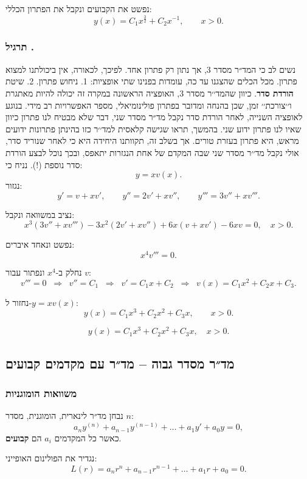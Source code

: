 \documentclass{article}
\numberwithin{equation}{section}
\newcounter{solution}[section]
\renewcommand{\thesolution}{\thesection.\arabic{solution}}
\newcommand{\solution}{%
  \refstepcounter{solution}%
  \subsubsection*{תרגיל \thesolution}%
  \label{sol:\thesolution}%
}
\begin{document}
נפשט את הקבועים ונקבל את הפתרון הכללי:
\[
\boxed{y(x) = C_1 x^{\tfrac{3}{2}} + C_2 x^{-1}, \qquad x>0.}
\]


\solution{}
נשים לב כי המד״ר מסדר 3, אך נתון רק פתרון אחד. לפיכך, לכאורה, אין ביכולתנו למצוא פתרון. מכל הכלים שהצגנו עד כה, עומדות בפנינו שתי אופציות: 1. ניחוש פתרון. 2. שיטת \textbf{הורדת סדר}. כיוון שהמד׳׳ר מסדר 3, האופציה הראשונה במקרה זה יכולה להיות מאתגרת ו׳׳צורכת׳׳ זמן, שכן בהנחה ומדובר בפתרון פולינומיאלי, מספר האפשרויות רב מידי. בנוגע לאופציה השנייה, לאחר הורדת סדר נקבל מד״ר מסדר שני, דבר שלא מבטיח לנו פתרון כיוון שאיו לנו פתרון ידוע שני. בהמשך, תראו שגישה קלאסית למד׳׳ר כזו בהינתן פתרונות ידועים מראש, היא פתרון בעזרת טורים. אך בשלב זה, תקוותנו היחידה היא כי לאחר שנוריד סדר, אולי נקבל מד׳׳ר מסדר שני שבה המקדם של אחת הנגזרות יתאפס, ובכך נוכל לבצע הורדת סדר נוספת (!).
נניח כי:
\[
y = x v(x).
\]
נגזור:
\[
y' = v + x v', \qquad
y'' = 2v' + x v'', \qquad
y''' = 3v'' + x v'''.
\]

נציב במשוואה ונקבל:
\[
x^3(3v'' + x v''') - 3x^2(2v' + x v'') + 6x(v + x v') - 6xv = 0, \quad x>0.
\]

נפשט ונאחד איברים:
\[
x^4 v''' = 0.
\]

נחלק ב-$x^{4}$ ונפתור עבור \(v\):
\[
v''' = 0 \;\;\Longrightarrow\;\; v'' = C_1 \;\;\Longrightarrow\;\; v' = C_1x + C_2 \;\;\Longrightarrow\;\; v(x) = C_1x^2 + C_2x + C_3.
\]

נחזור ל-\(y = x v(x)\):
\[
y(x) = C_1x^3 + C_2x^2 + C_3x, \qquad x>0.
\]

\[
\boxed{y(x) = C_1x^3 + C_2x^2 + C_3x, \quad x>0.}
\]


\newpage
\subsection{מד״ר מסדר גבוה – מד״ר עם מקדמים קבועים}

\subsubsection{משוואות הומוגניות}

נבחן מד״ר לינארית, הומוגנית, מסדר $n$:
\begin{equation}\label{fixed}
a_n y^{(n)} + a_{n-1}y^{(n-1)} + \dots + a_1 y' + a_0 y = 0,
\end{equation}
כאשר כל המקדמים $a_i$ הם \textbf{קבועים}.

נגדיר את הפולינום האופייני:
\begin{equation}
L(r) = a_n r^n + a_{n-1} r^{n-1} + \dots + a_1 r + a_0 = 0.
\end{equation}
\end{document}
